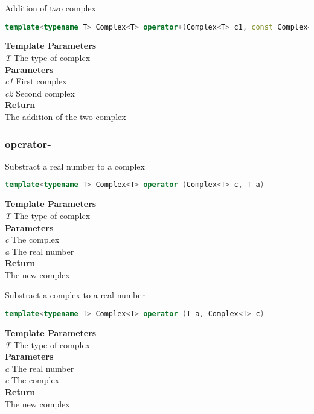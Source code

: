 \begin{mdframed}
Addition of two complex
\begin{lstlisting}[language=C++]
template<typename T> Complex<T> operator+(Complex<T> c1, const Complex<T>& c2) 
\end{lstlisting}
\textbf{Template Parameters} \\ 
\textit{T} The type of complex \\ 
\textbf{Parameters} \\ 
\textit{c1} First complex \\ 
\textit{c2} Second complex \\ 
\textbf{Return} \\ 
The addition of the two complex\\ 
\end{mdframed}

\subsubsection{operator-}
\begin{mdframed}
Substract a real number to a complex
\begin{lstlisting}[language=C++]
template<typename T> Complex<T> operator-(Complex<T> c, T a) 
\end{lstlisting}
\textbf{Template Parameters} \\ 
\textit{T} The type of complex \\ 
\textbf{Parameters} \\ 
\textit{c} The complex \\ 
\textit{a} The real number \\ 
\textbf{Return} \\ 
The new complex\\ 
\end{mdframed}

\begin{mdframed}
Substract a complex to a real number
\begin{lstlisting}[language=C++]
template<typename T> Complex<T> operator-(T a, Complex<T> c) 
\end{lstlisting}
\textbf{Template Parameters} \\ 
\textit{T} The type of complex \\ 
\textbf{Parameters} \\ 
\textit{a} The real number \\ 
\textit{c} The complex \\ 
\textbf{Return} \\ 
The new complex\\ 
\end{mdframed}

